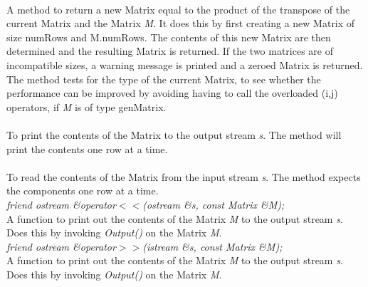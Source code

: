  \\ 
A method to return a new Matrix equal to the product of the transpose
of the current Matrix and the Matrix {\em M}. It does this by first
creating a new Matrix of size numRows and M.numRows. The contents of
this new Matrix are then determined and the resulting Matrix is
returned. If the two matrices are of incompatible sizes, a warning
message is printed and a zeroed Matrix is returned. The method tests
for the type of the current Matrix, to see whether the performance can
be improved by avoiding having to call the overloaded (i,j) operators,
if {\em M} is of type genMatrix. \\

 \\
To print the contents of the Matrix to the output stream {\em s}. The
method will print the contents one row at a time. \\ 

 \\
To read the contents of the Matrix from the input stream {\em s}. The method expects the components one row at a time. \\

{\em friend ostream \&operator$<<$(ostream \&s, const Matrix \&M);} \\
A function to print out the contents of the Matrix {\em M} to the
output stream {\em s}. Does this by invoking {\em Output()} on the
Matrix {\em M}.\\ 

{\em friend ostream \&operator$>>$(istream \&s, const Matrix \&M);} \\
A function to print out the contents of the Matrix {\em M} to the
output stream {\em s}. Does this by invoking {\em Output()} on the
Matrix {\em M}.\\ 

